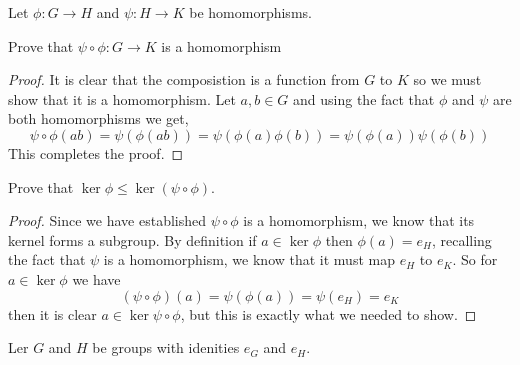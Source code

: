 \documentclass[11pt]{homework}
\begin{document}
\maketitle

\question
Let $\phi: G \to H$ and $\psi: H \to K$ be homomorphisms. 

\begin{alphaparts}
    \questionpart
    Prove that $\psi \circ \phi: G \to K$ is a homomorphism 

    \begin{proof}
        It is clear that the composistion is a function from $G$ to $K$ so we must show that it is a homomorphism. Let 
        $a, b \in G$ and using the fact that $\phi$ and $\psi$ are both homomorphisms we get, 
        \[\psi \circ \phi (ab) = \psi(\phi(ab)) = \psi(\phi(a)\phi(b)) = \psi(\phi(a))\psi(\phi(b))\]
        This completes the proof. 
    \end{proof}

    \questionpart
    Prove that $\ker \phi \leq \ker(\psi \circ \phi)$. 

    \begin{proof}
        Since we have established $\psi \circ \phi$ is a homomorphism, we know that its kernel forms a subgroup. 
        By definition if $a \in \ker \phi$ then $\phi(a) = e_H$, recalling the fact that $\psi$ is a homomorphism, 
        we know that it must map $e_H$ to $e_K$.  So for $a \in \ker \phi$ we have 
        \[(\psi \circ \phi)(a) = \psi(\phi(a)) = \psi(e_H) = e_K\]
        then it is clear $a \in \ker \psi \circ \phi$, but this is exactly what we needed to show. 
    \end{proof}
    
\end{alphaparts}

\question 
Ler $G$ and $H$ be groups with idenities $e_G$ and $e_H$. 
\end{document}
